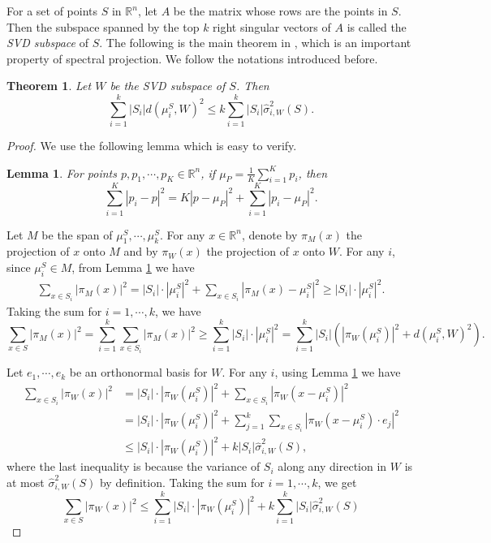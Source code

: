 \documentclass[11pt,letter]{article}
\newtheorem{lemma}{Lemma}
\newtheorem{theorem}{Theorem}
\begin{document}
For a set of points $S$ in $\mathbb R^n$, let $A$ be the matrix whose rows are the points in $S$. Then the subspace spanned by the top $k$ right singular vectors of $A$ is called the \emph{SVD subspace} of $S$. The following is the main theorem in \cite{Kannan08spectral}, which is an important property of spectral projection. We follow the notations introduced before.

\begin{theorem}\label{thm:spectral-svd}
Let $W$ be the SVD subspace of $S$. Then
\[
\sum_{i=1}^k |S_i| d(\mu_i^S, W)^2 \le k \sum_{i=1}^k |S_i| \hat \sigma_{i, W}^2(S).
\]
\end{theorem}
\begin{proof}
We use the following lemma which is easy to verify.
\begin{lemma}\label{lem:pythagorean}
For points $p, p_1, \cdots, p_K \in \mathbb R^n$, if $\mu_{P} = \frac1K\sum_{i=1}^K p_i$, then
\[
\sum_{i=1}^K |p_i - p|^2 = K|p - \mu_P|^2 + \sum_{i=1}^K |p_i - \mu_P|^2.
\]
\end{lemma}

Let $M$ be the span of $\mu_1^S, \cdots, \mu_k^S$. For any $x\in \mathbb R^n$, denote by $\pi_M(x)$ the projection of $x$ onto $M$ and by $\pi_W(x)$ the projection of $x$ onto $W$. For any $i$, since $\mu_i^S \in M$, from Lemma \ref{lem:pythagorean} we have
\begin{equation*}
\begin{aligned}
\sum_{x\in S_i} |\pi_M(x)|^2 = |S_i|\cdot|\mu_i^S|^2 + \sum_{x\in S_i} |\pi_M(x) - \mu_i^S|^2 
\ge |S_i|\cdot|\mu_i^S|^2.
\end{aligned}
\end{equation*}
Taking the sum for $i=1, \cdots, k$, we have
\begin{equation} \label{eqn1-svd-thm}
\sum_{x\in S}|\pi_M(x)|^2 = \sum_{i=1}^k \sum_{x\in S_i} |\pi_M(x)|^2
\ge \sum_{i=1}^k |S_i|\cdot|\mu_i^S|^2
= \sum_{i=1}^k |S_i| \left( |\pi_W(\mu_i^S)|^2 + d(\mu_i^S, W)^2 \right).
\end{equation}

Let $e_1, \cdots, e_k$ be an orthonormal basis for $W$. For any $i$, using Lemma \ref{lem:pythagorean} we have
\begin{equation*}
\begin{aligned}
\sum_{x\in S_i} |\pi_W(x)|^2 &= |S_i|\cdot|\pi_W(\mu_i^S)|^2 + \sum_{x\in S_i} |\pi_W(x - \mu_i^S)|^2\\
&= |S_i|\cdot|\pi_W(\mu_i^S)|^2 + \sum_{j=1}^k \sum_{x\in S_i} |\pi_W(x - \mu_i^S)\cdot e_j|^2\\
&\le |S_i|\cdot|\pi_W(\mu_i^S)|^2 + k|S_i| \hat \sigma_{i, W}^2(S),
\end{aligned}
\end{equation*}
where the last inequality is because the variance of $S_i$ along any direction in $W$ is at most $\hat \sigma_{i, W}^2(S)$ by definition. Taking the sum for $i=1,\cdots,k$, we get
\begin{equation} \label{eqn2-svd-thm}
\sum_{x\in S} |\pi_W(x)|^2 \le \sum_{i=1}^k |S_i|\cdot|\pi_W(\mu_i^S)|^2 + k\sum_{i=1}^k |S_i| \hat \sigma_{i, W}^2(S)
\end{equation}


\end{proof}
\end{document}
